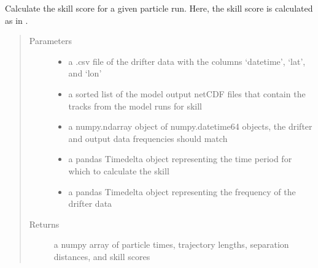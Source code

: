 \documentclass[letterpaper,10pt,english]{sphinxmanual}
\begin{document}
\begin{fulllineitems}
\label{\detokenize{octapy:octapy.tools.run_skill_analysis}}
\sphinxAtStartPar
Calculate the skill score for a given particle run. Here, the skill score
is calculated as in .
\begin{quote}\begin{description}
\item[{Parameters}] \leavevmode\begin{itemize}
\item {} 
\sphinxAtStartPar
{} \textendash{} a .csv file of the drifter data with the columns ‘datetime’, ‘lat’, and
‘lon’

\item {} 
\sphinxAtStartPar
{} \textendash{} a sorted list of the model output netCDF files that
contain the tracks from the model runs for skill

\item {} 
\sphinxAtStartPar
{} \textendash{} a numpy.ndarray object of numpy.datetime64 objects, the drifter and
output data frequencies should match

\item {} 
\sphinxAtStartPar
{} \textendash{} a pandas Timedelta object representing the time period for which to
calculate the skill

\item {} 
\sphinxAtStartPar
{} \textendash{} a pandas Timedelta object representing the frequency of the drifter data

\end{itemize}

\item[{Returns}] \leavevmode
\sphinxAtStartPar
a numpy array of particle times, trajectory lengths, separation
distances, and skill scores

\end{description}\end{quote}

\end{fulllineitems}
\end{document}
